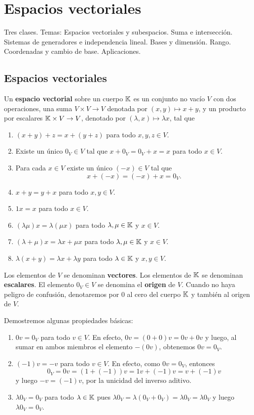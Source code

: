 \chapter{Espacios vectoriales}

Tres clases. Temas: Espacios vectoriales y subespacios. Suma e intersección.
Sistemas de generadores e independencia lineal. Bases y dimensión. Rango.
Coordenadas y cambio de base. Aplicaciones. 

\section{Espacios vectoriales}

\begin{block}
	Un \textbf{espacio vectorial} sobre un cuerpo $\mathbb{K}$ es un conjunto no vacío
	$V$ con dos operaciones, una suma $V\times V\to V$ denotada por
	$(x,y)\mapsto x+y$, y un producto por escalares $\mathbb{K}\times V\to V$, denotado
	por $(\lambda,x)\mapsto \lambda x$, tal que
    \begin{enumerate}
        \item $(x+y)+z=x+(y+z)$ para todo $x,y,z\in V$.        
        \item Existe un único $0_V\in V$ tal que $x+0_V=0_V+x=x$ para todo $x\in V$.
        \item Para cada $x\in V$ existe un único $(-x)\in V$ tal que \[x+(-x)=(-x)+x=0_V.\]
        \item $x+y=y+x$ para todo $x,y\in V$.
        \item $1x=x$ para todo $x\in V$.
        \item $(\lambda\mu)x=\lambda(\mu x)$ para todo $\lambda,\mu\in\mathbb{K}$ y $x\in V$.
        \item $(\lambda+\mu)x=\lambda x+\mu x$ para todo $\lambda,\mu\in\mathbb{K}$ y $x\in V$.
        \item $\lambda(x+y)=\lambda x+\lambda y$ para todo $\lambda\in\mathbb{K}$ y $x,y\in V$.
    \end{enumerate}
	Los elementos de $V$ se denominan \textbf{vectores}. Los elementos de $\mathbb{K}$
	se denominan \textbf{escalares}. El elemento $0_V\in V$ se denomina el
	\textbf{origen} de $V$.  Cuando no haya peligro de confusión, denotaremos
	por $0$ al cero del cuerpo $\mathbb{K}$ y también al origen de $V$.
\end{block}

\begin{block}
	Demostremos algunas propiedades básicas:
	\begin{enumerate}
		\item $0v=0_V$ para todo $v\in V$. En efecto, $0v=(0+0)v=0v+0v$ y luego, al sumar en
			ambos miembros el elemento $-(0v)$, obtenemos $0v=0_V$.
		\item $(-1)v=-v$ para todo $v\in V$. En efecto, como $0v=0_V$, entonces
			\[
			0_V=0v=(1+(-1))v=1v+(-1)v=v+(-1)v
			\]
			y luego $-v=(-1)v$, por la unicidad
			del inverso aditivo.
		\item $\lambda0_V=0_V$ para todo $\lambda\in\mathbb{K}$ pues
			$\lambda0_V=\lambda (0_V+0_V)=\lambda0_V=\lambda0_V$ y luego
			$\lambda0_V=0_V$. 
	\end{enumerate}
\end{block}

